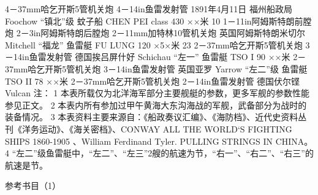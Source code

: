 \documentclass[12pt,UTF8]{ctexbook}
\begin{document}
4－37mm哈乞开斯5管机关炮
4－14in鱼雷发射管 1891年4月11日 福州船政局
Foochow
“镇北”级
蚊子船
CHEN PEI class 430 ××米 10 1－11in阿姆斯特朗前膛炮
2－3in阿姆斯特朗后膛炮
2－11mm加特林10管机关炮 英国阿姆斯特朗米切尔
Mitchell
“福龙”
鱼雷艇
FU LUNG 120 ×5×米 23 2－37mm哈乞开斯5管机关炮
3－14in鱼雷发射管 德国挨吕屏什好
Schichau
“左一”
鱼雷艇
TSO I 90 ××米 2－37mm哈乞开斯5管机关炮
3－14in鱼雷发射管 英国亚罗
Yarrow
“左二”级
鱼雷艇
TSO II 78 ××米 2－37mm哈乞开斯5管机关炮
2－14in鱼雷发射管 德国伏尔铿
Vulcan
注：
1 本表所载仅为北洋海军部分主要舰艇的参数，更多军舰的参数性能参见正文。
2 本表内所有参加过甲午黄海大东沟海战的军舰，武备部分为战时的装备情况。
3 本表资料主要来源自：《船政奏议汇编》、《海防档》、近代史资料丛刊《洋务运动》、《海关密档》、CONWAY ALL THE WORLD`S FIGHTING SHIPS 1860-1905 、William Ferdinand Tyler. PULLING STRINGS IN CHINA。
4 “左二”级鱼雷艇中，“左二”、“左三”2艘的航速为节，“右一”、“右二”、“右三”的航速是节。




参考书目（1）
\end{document}
